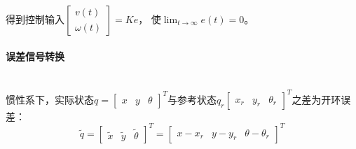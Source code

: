 \documentclass[
12pt, %
a4paper, 
oneside, %
headinclude,footinclude, %
]{scrartcl}
\begin{document}
得到控制输入$ \begin{bmatrix} v(t) \\ \omega(t) \end{bmatrix} = Ke $，
使$ \lim_{t \to \infty} e(t) = 0 $。
\paragraph{误差信号转换}~\\

惯性系下，实际状态$ q = \begin{bmatrix} x & y & \theta \end{bmatrix}^T $与参考状态$ q_r \begin{bmatrix} x_r & y_r & \theta_r \end{bmatrix}^T $之差为开环误差：
$$ \tilde{q} = \begin{bmatrix} \tilde{x} & \tilde{y} & \tilde{\theta} \end{bmatrix}^T = \begin{bmatrix} x - x_r & y - y_r & \theta - \theta_r \end{bmatrix}^T $$
\end{document}
